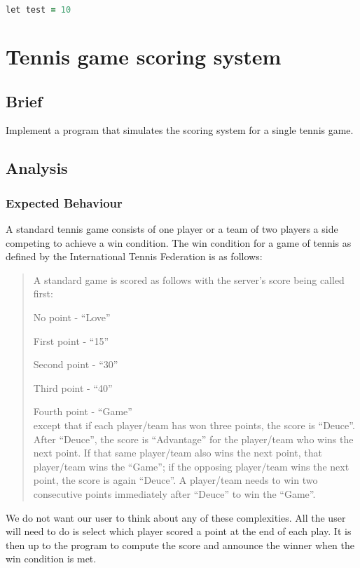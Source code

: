 \begin{lstlisting}[language=F]
let test = 10
\end{lstlisting}

\section{Tennis game scoring system}

\subsection{Brief}

Implement a program that simulates the scoring system for a single tennis game.

\subsection{Analysis}

\subsubsection{Expected Behaviour}
A standard tennis game consists of one player or a team of two players a side competing to achieve a win condition. The win condition for a game of tennis as defined by the International Tennis Federation is as follows:

\begin{quote}
  A standard game is scored as follows with the server’s score being called
  first:

  No point - “Love”

  First point - “15”

  Second point - “30”

  Third point - “40”

  Fourth point - “Game”\\
  except that if each player/team has won three points, the score is “Deuce”.
  After “Deuce”, the score is “Advantage” for the player/team who wins the
  next point. If that same player/team also wins the next point, that player/team
  wins the “Game”; if the opposing player/team wins the next point, the score is
  again “Deuce”. A player/team needs to win two consecutive points
  immediately after “Deuce” to win the “Game”. \parencite{itf}
\end{quote}

We do not want our user to think about any of these complexities.
All the user will need to do is select which player scored a point at the end of each play. It is then up to the program to compute the score and announce the winner when the win condition is met.

